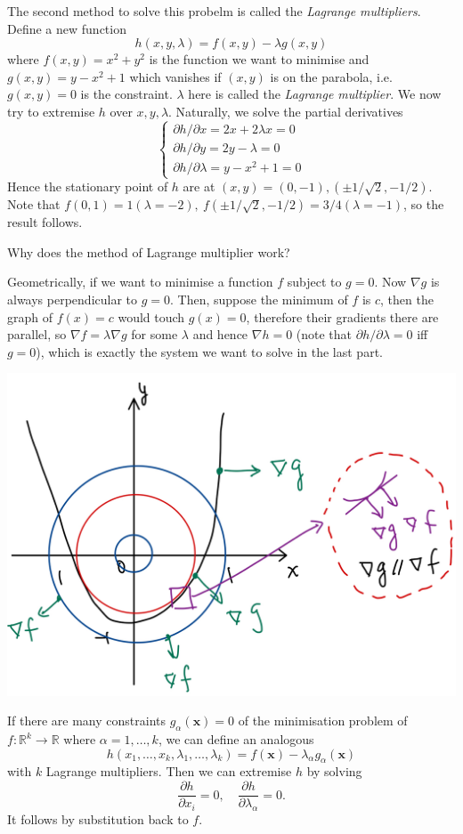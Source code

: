 \documentclass[a4paper]{article}
\begin{document}
\begin{example}
    The second method to solve this probelm is called the \textit{Lagrange multipliers}.
    Define a new function
    $$h(x,y,\lambda)=f(x,y)-\lambda g(x,y)$$
    where $f(x,y)=x^2+y^2$ is the function we want to minimise and $g(x,y)=y-x^2+1$ which vanishes if $(x,y)$ is on the parabola, i.e. $ g(x,y)=0 $ is the constraint.
    $\lambda$ here is called the \textit{Lagrange multiplier}.
    We now try to extremise $h$ over $x,y,\lambda$.
    Naturally, we solve the partial derivatives
    $$\begin{cases}
        \partial h/\partial x=2x+2\lambda x=0\\
        \partial h/\partial y=2y-\lambda=0\\
        \partial h/\partial\lambda=y-x^2+1=0
    \end{cases}$$
    Hence the stationary point of $h$ are at $(x,y)=(0,-1),(\pm 1/\sqrt{2},-1/2)$.
    Note that $ f(0,1)=1(\lambda=-2),\ f(\pm 1/\sqrt{2},-1/2)=3/4(\lambda=-1) $, so the result follows.
\end{example}

Why does the method of Lagrange multiplier work?

Geometrically, if we want to minimise a function $f$ subject to $g=0$.
Now $\nabla g$ is always perpendicular to $g=0$.
Then, suppose the minimum of $f$ is $c$, then the graph of $f(x)=c$ would touch $g(x)=0$, therefore their gradients there are parallel, so $\nabla f=\lambda\nabla g$ for some $\lambda$ and hence $\nabla h=0$ (note that $\partial h/\partial\lambda=0$ iff $g=0$), which is exactly the system we want to solve in the last part.

\begin{center}
    \includegraphics[scale=0.15]{best_fit_circ2.jpeg}
\end{center}

If there are many constraints $g_\alpha(\mathbf{x})=0$ of the minimisation problem of $f:\mathbb R^k\to\mathbb R$ where $\alpha=1,\dots,k$, we can define an analogous
$$h(x_1,\ldots,x_k,\lambda_1,\ldots,\lambda_k)=f(\mathbf{x})-\lambda_\alpha g_\alpha(\mathbf{x})$$
with $k$ Lagrange multipliers. Then we can extremise $h$ by solving 
\[
    \frac{\partial h}{\partial x_i} = 0,\quad \frac{\partial h}{\partial \lambda_\alpha}=0.  
\]
It follows by substitution back to $f$.
\end{document}
